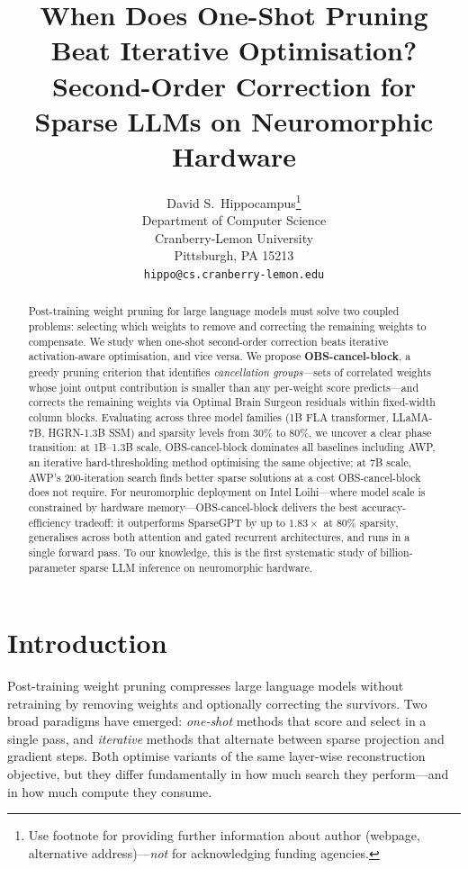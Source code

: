 \documentclass{article}
\title{When Does One-Shot Pruning Beat Iterative Optimisation?\\
       Second-Order Correction for Sparse LLMs on Neuromorphic Hardware}
\author{%
  David S.~Hippocampus\thanks{Use footnote for providing further information
    about author (webpage, alternative address)---\emph{not} for acknowledging
    funding agencies.} \\
  Department of Computer Science\\
  Cranberry-Lemon University\\
  Pittsburgh, PA 15213 \\
  \texttt{hippo@cs.cranberry-lemon.edu} \\
}
\begin{document}
\maketitle

\begin{abstract}
Post-training weight pruning for large language models must solve two coupled problems: selecting which weights to remove and correcting the remaining weights to compensate. We study when one-shot second-order correction beats iterative activation-aware optimisation, and vice versa. We propose \textbf{OBS-cancel-block}, a greedy pruning criterion that identifies \emph{cancellation groups}---sets of correlated weights whose joint output contribution is smaller than any per-weight score predicts---and corrects the remaining weights via Optimal Brain Surgeon residuals within fixed-width column blocks. Evaluating across three model families (1B FLA transformer, LLaMA-7B, HGRN-1.3B SSM) and sparsity levels from 30\% to 80\%, we uncover a clear phase transition: at 1B--1.3B scale, OBS-cancel-block dominates all baselines including AWP, an iterative hard-thresholding method optimising the same objective; at 7B scale, AWP's 200-iteration search finds better sparse solutions at a cost OBS-cancel-block does not require. For neuromorphic deployment on Intel Loihi---where model scale is constrained by hardware memory---OBS-cancel-block delivers the best accuracy-efficiency tradeoff: it outperforms SparseGPT by up to $1.83\times$ at 80\% sparsity, generalises across both attention and gated recurrent architectures, and runs in a single forward pass. To our knowledge, this is the first systematic study of billion-parameter sparse LLM inference on neuromorphic hardware.
\end{abstract}


\section{Introduction}
\label{sec:intro}

Post-training weight pruning compresses large language models without retraining by removing weights and optionally correcting the survivors. Two broad paradigms have emerged: \emph{one-shot} methods that score and select in a single pass, and \emph{iterative} methods that alternate between sparse projection and gradient steps. Both optimise variants of the same layer-wise reconstruction objective, but they differ fundamentally in how much search they perform---and in how much compute they consume.
\end{document}
